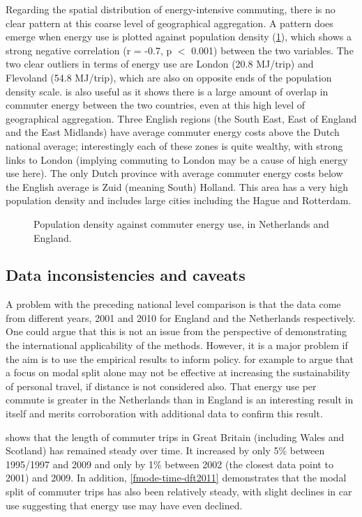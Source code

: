 Regarding the spatial distribution of energy-intensive commuting,
there is no clear pattern at this coarse level of geographical aggregation.
A pattern does emerge when energy use is plotted against
population density (\cref{fepdensnl}), which shows a strong negative correlation
(r = -0.7, p $<$ 0.001) between the two variables. The two clear outliers in
terms of energy use are London (20.8 MJ/trip) and Flevoland (54.8 MJ/trip),
which are also on opposite ends of the population density scale.
 is also useful as it shows there is a large amount of
overlap in commuter energy between the two countries, even at this high
level of geographical aggregation. Three English regions
(the South East, East of England and the East Midlands) have average
commuter energy costs above the Dutch national average; interestingly
each of these zones is quite wealthy, with strong links to London
(implying commuting to London may be a cause of high energy use here).
The only Dutch province with average commuter energy costs below the
English average is Zuid (meaning South) Holland. This area has a very high
population density and includes large cities including the Hague and
Rotterdam.

\begin{figure}
 \caption[Population density against commuter energy use]
 {Population density against commuter energy use, in Netherlands and England.}
 \label{fepdensnl}
\end{figure}

\subsection{Data inconsistencies and caveats}
A problem with the preceding national level comparison is that the
data come from different years, 2001 and 2010 for England and the Netherlands
respectively. One could argue that this is not an issue
from the perspective of demonstrating the international applicability of the
methods. However, it is a major problem if the aim is to use the empirical results
to inform policy.
for example to argue that a focus on modal split alone may not be  effective at
increasing the sustainability of personal travel, if distance is not considered
also. %
That energy use per commute is greater in the Netherlands
than in England is an interesting result in itself and merits
corroboration with additional data to confirm this result.

 shows that the length of commuter trips in Great
Britain (including Wales and Scotland) has remained steady over
time. It increased by only 5\% between 1995/1997 and 2009 and only by
1\% between 2002 (the closest data point to 2001) and 2009. In addition,
\cref{fmode-time-dft2011} demonstrates that the modal split of commuter trips
has also been relatively steady, with slight declines in car use suggesting that
energy use may have even declined. 

